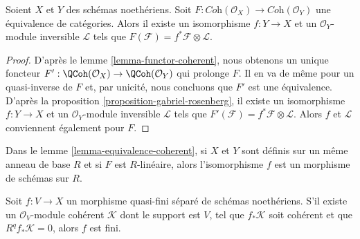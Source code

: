 \begin{lemma}
\label{lemma-equivalence-coherent}
Soient $X$ et $Y$ des schémas noethériens. Soit
$F : \textit{Coh}(\mathcal{O}_X) \to \textit{Coh}(\mathcal{O}_Y)$
une équivalence de catégories. Alors il existe un isomorphisme $f : Y \to X$
et un $\mathcal{O}_Y$-module inversible $\mathcal{L}$ tels que
$F(\mathcal{F}) = f^*\mathcal{F} \otimes \mathcal{L}$.
\end{lemma}

\begin{proof}
D'après le lemme \ref{lemma-functor-coherent}, nous obtenons un unique foncteur
$F' : \QCoh(\mathcal{O}_X) \to \QCoh(\mathcal{O}_Y)$ qui prolonge $F$.
Il en va de même pour un quasi-inverse de $F$ et, par unicité, nous concluons
que $F'$ est une équivalence. D'après la
proposition \ref{proposition-gabriel-rosenberg}, il existe un isomorphisme
$f : Y \to X$ et un $\mathcal{O}_Y$-module inversible $\mathcal{L}$
tels que $F'(\mathcal{F}) = f^*\mathcal{F} \otimes \mathcal{L}$.
Alors $f$ et $\mathcal{L}$ conviennent également pour $F$.
\end{proof}

\begin{remark}
\label{remark-equivalence-coherent-linear}
Dans le lemme \ref{lemma-equivalence-coherent}, si $X$ et $Y$ sont définis
sur un même anneau de base $R$ et si $F$ est $R$-linéaire, alors
l'isomorphisme $f$ est un morphisme de schémas sur $R$.
\end{remark}

\begin{lemma}
\label{lemma-characterize-finite}
Soit $f : V \to X$ un morphisme quasi-fini séparé de schémas noethériens.
S'il existe un $\mathcal{O}_V$-module cohérent $\mathcal{K}$ dont le support
est $V$, tel que $f_*\mathcal{K}$ soit cohérent et que
$R^qf_*\mathcal{K} = 0$, alors $f$ est fini.
\end{lemma}

